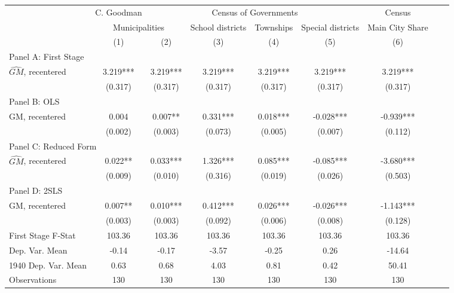  \begin{tabular}{l*{8}{c}} \toprule
&\multicolumn{1}{c}{C. Goodman}&\multicolumn{4}{c}{Census of Governments}&\multicolumn{1}{c}{Census}\\\cmidrule(lr){2-2}\cmidrule(lr){3-6}\cmidrule(lr){7-7}
&\multicolumn{2}{c}{Municipalities}&\multicolumn{1}{c}{School districts}&\multicolumn{1}{c}{Townships}&\multicolumn{1}{c}{Special districts}&\multicolumn{1}{c}{Main City Share}\\\cmidrule(lr){2-3}\cmidrule(lr){4-6}\cmidrule(lr){7-7}
&\multicolumn{1}{c}{(1)}&\multicolumn{1}{c}{(2)}&\multicolumn{1}{c}{(3)}&\multicolumn{1}{c}{(4)}&\multicolumn{1}{c}{(5)}&\multicolumn{1}{c}{(6)}\\
\cmidrule(lr){1-7}
\multicolumn{6}{l}{Panel A: First Stage}\\
\cmidrule(lr){1-7}
$\widehat{GM}$, recentered&    3.219***&    3.219***&    3.219***&    3.219***&    3.219***&    3.219***\\
                &  (0.317)   &  (0.317)   &  (0.317)   &  (0.317)   &  (0.317)   &  (0.317)   \\
\cmidrule(lr){1-7}
\multicolumn{6}{l}{Panel B: OLS}\\
\cmidrule(lr){1-7}
GM, recentered  &    0.004   &    0.007** &    0.331***&    0.018***&   -0.028***&   -0.939***\\
                &  (0.002)   &  (0.003)   &  (0.073)   &  (0.005)   &  (0.007)   &  (0.112)   \\
\cmidrule(lr){1-7}
\multicolumn{6}{l}{Panel C: Reduced Form}\\
\cmidrule(lr){1-7}
$\widehat{GM}$, recentered&    0.022** &    0.033***&    1.326***&    0.085***&   -0.085***&   -3.680***\\
                &  (0.009)   &  (0.010)   &  (0.316)   &  (0.019)   &  (0.026)   &  (0.503)   \\
\cmidrule(lr){1-7}
\multicolumn{6}{l}{Panel D: 2SLS}\\
\cmidrule(lr){1-7}
GM, recentered  &    0.007** &    0.010***&    0.412***&    0.026***&   -0.026***&   -1.143***\\
                &  (0.003)   &  (0.003)   &  (0.092)   &  (0.006)   &  (0.008)   &  (0.128)   \\
\midrule
First Stage F-Stat&   103.36   &   103.36   &   103.36   &   103.36   &   103.36   &   103.36   \\
Dep. Var. Mean  &    -0.14   &    -0.17   &    -3.57   &    -0.25   &     0.26   &   -14.64   \\
1940 Dep. Var. Mean&     0.63   &     0.68   &     4.03   &     0.81   &     0.42   &    50.41   \\
Observations    &      130   &      130   &      130   &      130   &      130   &      130   \\
       \bottomrule \end{tabular}
